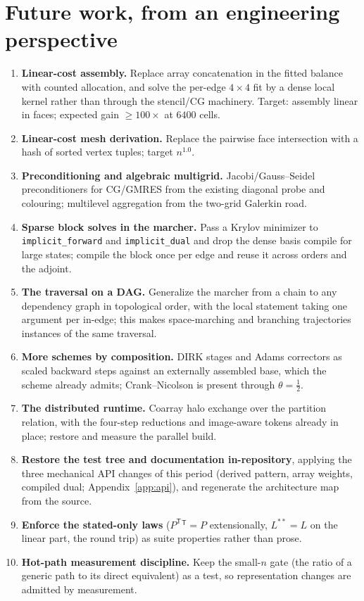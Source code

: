 \documentclass[11pt,a4paper]{article}
\newcommand{\tr}{^{\mathsf T}}
\newcommand{\code}[1]{\texttt{#1}}
\begin{document}
\section{Future work, from an engineering perspective}\label{sec:future}

\begin{enumerate}[nosep]
\item \textbf{Linear-cost assembly.} Replace array concatenation in the fitted balance with counted allocation, and solve the per-edge $4\times4$ fit by a dense local kernel rather than through the stencil/CG machinery. Target: assembly linear in faces; expected gain $\ge 100\times$ at $6400$ cells.
\item \textbf{Linear-cost mesh derivation.} Replace the pairwise face intersection with a hash of sorted vertex tuples; target $n^{1.0}$.
\item \textbf{Preconditioning and algebraic multigrid.} Jacobi/Gauss--Seidel preconditioners for CG/GMRES from the existing diagonal probe and colouring; multilevel aggregation from the two-grid Galerkin road.
\item \textbf{Sparse block solves in the marcher.} Pass a Krylov minimizer to \code{implicit\_forward} and \code{implicit\_dual} and drop the dense basis compile for large states; compile the block once per edge and reuse it across orders and the adjoint.
\item \textbf{The traversal on a DAG.} Generalize the marcher from a chain to any dependency graph in topological order, with the local statement taking one argument per in-edge; this makes space-marching and branching trajectories instances of the same traversal.
\item \textbf{More schemes by composition.} DIRK stages and Adams correctors as scaled backward steps against an externally assembled base, which the scheme already admits; Crank--Nicolson is present through $\theta=\tfrac12$.
\item \textbf{The distributed runtime.} Coarray halo exchange over the partition relation, with the four-step reductions and image-aware tokens already in place; restore and measure the parallel build.
\item \textbf{Restore the test tree and documentation in-repository}, applying the three mechanical API changes of this period (derived pattern, array weights, compiled dual; Appendix~\ref{app:api}), and regenerate the architecture map from the source.
\item \textbf{Enforce the stated-only laws} ($P\tr{}\tr=P$ extensionally, $L^{**}=L$ on the linear part, the round trip) as suite properties rather than prose.
\item \textbf{Hot-path measurement discipline.} Keep the small-$n$ gate (the ratio of a generic path to its direct equivalent) as a test, so representation changes are admitted by measurement.
\end{enumerate}
\end{document}
